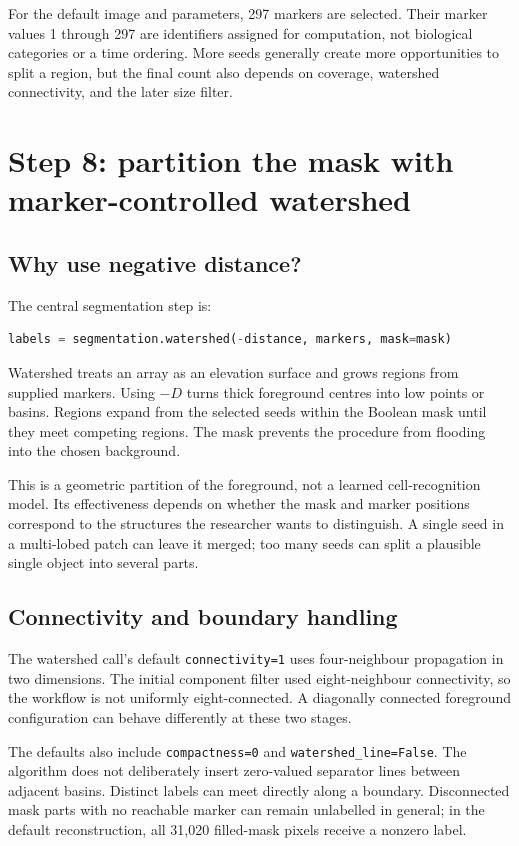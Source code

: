 \documentclass[11pt,letterpaper]{article}
\newcommand{\field}[1]{\nolinkurl{#1}}
\begin{document}
For the default image and parameters, 297 markers are selected. Their marker values 1 through 297 are identifiers assigned for computation, not biological categories or a time ordering. More seeds generally create more opportunities to split a region, but the final count also depends on coverage, watershed connectivity, and the later size filter.

\section{Step 8: partition the mask with marker-controlled watershed}
\label{sec:watershed}

\subsection{Why use negative distance?}
The central segmentation step is:
\begin{lstlisting}[language=Python]
labels = segmentation.watershed(-distance, markers, mask=mask)
\end{lstlisting}
Watershed treats an array as an elevation surface and grows regions from supplied markers. Using $-D$ turns thick foreground centres into low points or basins. Regions expand from the selected seeds within the Boolean mask until they meet competing regions. The mask prevents the procedure from flooding into the chosen background.\cite{segmentation}

This is a geometric partition of the foreground, not a learned cell-recognition model. Its effectiveness depends on whether the mask and marker positions correspond to the structures the researcher wants to distinguish. A single seed in a multi-lobed patch can leave it merged; too many seeds can split a plausible single object into several parts.

\subsection{Connectivity and boundary handling}
The watershed call's default \field{connectivity=1} uses four-neighbour propagation in two dimensions. The initial component filter used eight-neighbour connectivity, so the workflow is not uniformly eight-connected. A diagonally connected foreground configuration can behave differently at these two stages.

The defaults also include \field{compactness=0} and \field{watershed_line=False}. The algorithm does not deliberately insert zero-valued separator lines between adjacent basins. Distinct labels can meet directly along a boundary. Disconnected mask parts with no reachable marker can remain unlabelled in general; in the default reconstruction, all 31,020 filled-mask pixels receive a nonzero label.
\end{document}

